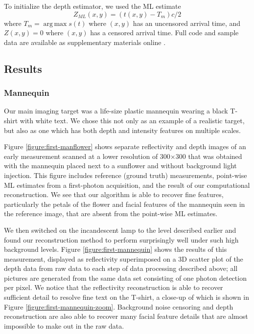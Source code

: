 To initialize the depth estimator, we used the ML estimate
\begin{equation}
Z_{ML}(x,y) = (t(x,y) - T_m)c/2
\end{equation}
where $T_m = \operatorname{arg\,max} s(t)$ where $(x,y)$ has an uncensored arrival time, and $Z(x,y) = 0$ where $(x,y)$ has a censored arrival time. Full code and sample data are available as supplementary materials online \cite{kirmani-first}.

\subsection{Results}

\subsubsection{Mannequin}
Our main imaging target was a life-size plastic mannequin wearing a black T-shirt with white text. We chose this not only as an example of a realistic target, but also as one which has both depth and intensity features on multiple scales.

Figure \ref{figure:first-manflower} shows separate reflectivity and depth images of an early measurement scanned at a lower resolution of 300$\times$300 that was obtained with the mannequin placed next to a sunflower and without background light injection. This figure includes reference (ground truth) measurements, point-wise ML estimates from a first-photon acquisition, and the result of our computational reconstruction. We see that our algorithm is able to recover fine features, particularly the petals of the flower and facial features of the mannequin seen in the reference image, that are absent from the point-wise ML estimates.

We then switched on the incandescent lamp to the level described earlier and found our reconstruction method to perform surprisingly well under such high background levels. Figure \ref{figure:first-mannequin} shows the results of this measurement, displayed as reflectivity superimposed on a 3D scatter plot of the depth data from raw data to each step of data processing described above; all pictures are generated from the same data set consisting of one photon detection per pixel. We notice that the reflectivity reconstruction is able to recover sufficient detail to resolve fine text on the T-shirt, a close-up of which is shown in Figure \ref{figure:first-mannequin-zoom}. Background noise censoring and depth reconstruction are also able to recover many facial feature details that are almost impossible to make out in the raw data.

